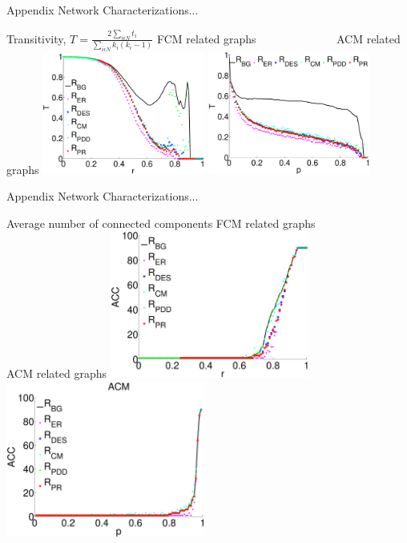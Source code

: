 \documentclass{beamer}
\begin{document}
\begin{frame}{Appendix}
Network Characterizations...

{Transitivity,  $T = \frac{2\sum\limits_{i \epsilon N}  t_i}{\sum\limits_{i \epsilon N}k_i (k_i - 1)}$ } 
\break
\break
\break
\footnotesize{FCM related graphs ~~~~~~~~~~~~~ ACM related graphs}
	\centering	
    \includegraphics[width=0.40\textwidth]{Figures/Transitivity_Fnc.eps}
	\includegraphics[width=0.40\textwidth]{Figures/Transitivity_Stru.eps} 
	
\end{frame}


\begin{frame}{Appendix}
Network Characterizations...

{Average number of connected components } 
\break
\break
\break
\footnotesize{FCM related graphs ~~~~~~~~~~~~~ ACM related graphs}
	\centering	
	 \includegraphics[width=0.49\textwidth]{Figures/connec_compo_FCM.eps}
	 \includegraphics[width=0.49\textwidth]{Figures/connec_compo_ACM.eps}
	
\end{frame}
\end{document}
